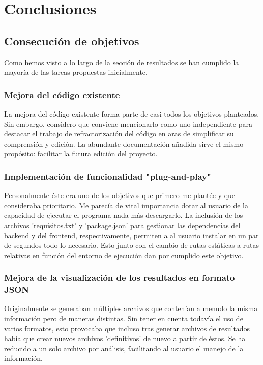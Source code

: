\documentclass[a4paper, 12pt]{book}
\begin{document}
\cleardoublepage
\chapter{Conclusiones}
\label{chap:conclusiones}


\section{Consecución de objetivos}
\label{sec:consecucion-objetivos}

Como hemos visto a lo largo de la sección de resultados se han cumplido la mayoría de las tareas propuestas inicialmente. 

\subsection{Mejora del código existente}

La mejora del código existente forma parte de casi todos los objetivos planteados. Sin embargo, considero que conviene mencionarlo como uno independiente para destacar el trabajo de refractorización del código en aras de simplificar su comprensión y edición. La abundante documentación añadida sirve el mismo propósito: facilitar la futura edición del proyecto.

\subsection{Implementación de funcionalidad "plug-and-play"}

Personalmente éste era uno de los objetivos que primero me plantée y que consideraba prioritario. Me parecía de vital importancia dotar al usuario de la capacidad de ejecutar el programa nada más descargarlo. La inclusión de los archivos 'requisitos.txt' y 'package.json' para gestionar las dependencias del backend y del frontend, respectivamente, permiten a al usuario instalar en un par de segundos todo lo necesario. Esto junto con el cambio de rutas estáticas a rutas relativas en función del entorno de ejecución dan por cumplido este objetivo.

\subsection{Mejora de la visualización de los resultados en formato JSON}

Originalmente se generaban múltiples archivos que contenían a menudo la misma información pero de maneras distintas. Sin tener en cuenta todavía el uso de varios formatos, esto provocaba que incluso tras generar archivos de resultados había que crear nuevos archivos 'definitivos' de nuevo a partir de éstos. Se ha reducido a un solo archivo por análisis, facilitando al usuario el manejo de la información.
\end{document}
